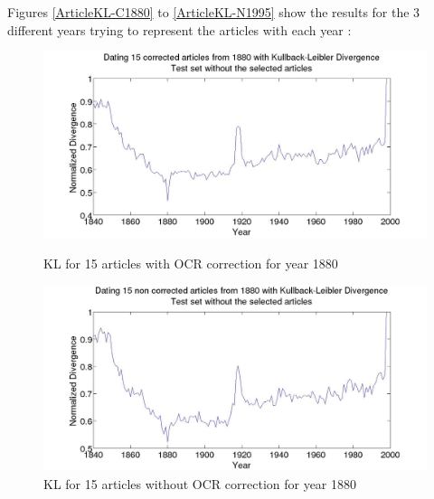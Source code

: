 Figures \ref{ArticleKL-C1880} to \ref{ArticleKL-N1995} show the results for the 3 different years trying to represent the articles with each year :

\begin{figure}[H]
    \begin{minipage}[b]{0.48\linewidth}
        \includegraphics[scale=0.15]{Pictures/date_articles/kullback_leibler/15articles_1880_KL_years_simulate_articles_corrected_without_articles.jpg}
        \caption{KL for 15 articles with OCR correction for year 1880}
        \label{ArticleKL-C1880}
    \end{minipage}\hfill
    \begin{minipage}[b]{0.5\linewidth}
        \includegraphics[scale=0.15]{Pictures/date_articles/kullback_leibler/15articles_1880_KL_years_simulate_articles_without_correction_without_articles.jpg}
        \caption{KL for 15 articles without OCR correction for year 1880}
        \label{ArticleKL-N1880}
    \end{minipage}\hfill
\end{figure}

